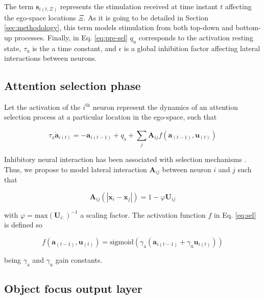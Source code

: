 \documentclass[letterpaper, 10 pt, conference]{ieeeconf}  %
\begin{document}
	The term $\mathbf{s}_{i(t,\Xi)}$ represents the stimulation received at time instant $t$ affecting the ego-space locations $\Xi$. As it is going to be detailed in Section \ref{sec:methodology}, this term models stimulation from both top-down and bottom-up processes. Finally, in Eq. \eqref{eq:pre-sel} $q_\mathrm{u}$ corresponds to the activation resting state, $\tau_\mathrm{u}$ is the a time constant, and $\epsilon$ is a global inhibition factor affecting lateral interactions between neurons.
	 
	\subsection{Attention selection phase}
	
	Let the activation of the $i^\mathrm{th}$ neuron represent the dynamics of an attention selection process at a particular location in the ego-space, such that 
	
	\begin{equation}
	\tau_\mathrm{a} \dot{\mathbf{a}}_{i(t)} = -\mathbf{a}_{i(t-1)} + q_\mathrm{a} + \sum_{j}^{} \mathbf{A}_{ij}f\left(\mathbf{a}_{(t-1)}, \mathbf{u}_{(t)}\right) 
	\label{eq:sel}
	\end{equation}
	
	\noindent Inhibitory neural interaction has been associated with selection mechanisms \cite{schoner2016}. Thus, we propose to model lateral interaction $\mathbf{A}_{ij}$ between neuron $i$ and $j$ such that

	\begin{equation}
	\mathbf{A}_{ij}(|\mathbf{x}_i-\mathbf{x}_j|) = 1 - \varphi\mathbf{U}_{ij}	
	\label{eq:sel-syn}
	\end{equation}
	
	\noindent with $\varphi = \mathrm{max}(\mathbf{U}_{i:})^{-1}$ a scaling factor. The activation function $f$ in Eq. \eqref{eq:sel} is defined so

	\begin{equation}
	f\left(\mathbf{a}_{(t-1)}, \mathbf{u}_{(t)}\right) = \mathrm{sigmoid} \left(\gamma_\mathrm{a} \left(\mathbf{a}_{i(t-1)} + \gamma_\mathrm{u} \mathbf{u}_{i(t)}\right)\right)
	\label{eq:sel-fa}
	\end{equation}
	
	\noindent being $\gamma_\mathrm{a}$ and $\gamma_\mathrm{u}$ gain constants.
	
	\subsection{Object focus output layer}
	
\end{document}
